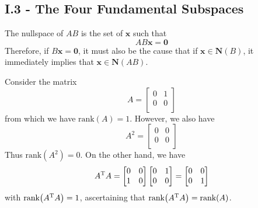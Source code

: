 \documentclass[a4paper]{article}
\begin{document}
\newpage
\subsection{\textsf{I.3 - The Four Fundamental Subspaces}}


The nullspace of \(AB\) is the set of \(\bm{x}\) such that 
\[
	AB \bm{x} = \bm{0}
\]
Therefore, if \(B \bm{x} = \bm{0}\), it must also be the cause that if \(\bm{x} \in \textbf{N}\!\left( B \right) \), it immediately implies that \(\bm{x} \in \textbf{N}\!\left( AB \right) \).

\vspace{12pt}


Consider the matrix
\[
	A = 
	\begin{bmatrix}
		0 & 1 \\
		0 & 0 \\
	\end{bmatrix}
\]
from which we have \(\text{rank}\!\left( A \right) = 1\). However, we also have
\[
	A^{2} =
	\begin{bmatrix}
		0 & 0 \\
		0 & 0 \\
	\end{bmatrix}
\]
Thus \(\text{rank}\!\left( A^{2} \right) = 0\). On the other hand, we have
\[
	A^{\textsc{T}}A = 
	\begin{bmatrix}
		0 & 0 \\
		1 & 0 \\
	\end{bmatrix}
	\begin{bmatrix}
		0 & 1 \\
		0 & 0 \\
	\end{bmatrix}
	=
	\begin{bmatrix}
		0 & 0 \\
		0 & 1 \\
	\end{bmatrix}
\]
with \(\text{rank}\!\left( A^{\textsc{T}}A \right) = 1\), ascertaining that \(\text{rank}\!\left( A^{\textsc{T}}A \right) = \text{rank}\!\left( A \right) \).

\vspace{12pt}
\end{document}
